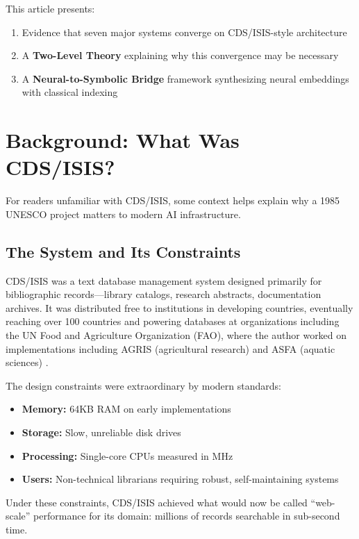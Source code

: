 \documentclass[manuscript,screen,nonacm]{acmart}
\begin{document}
This article presents:
\begin{enumerate}
    \item Evidence that seven major systems converge on CDS/ISIS-style architecture
    \item A \textbf{Two-Level Theory} explaining why this convergence may be necessary
    \item A \textbf{Neural-to-Symbolic Bridge} framework synthesizing neural embeddings with classical indexing
\end{enumerate}

\section{Background: What Was CDS/ISIS?}

For readers unfamiliar with CDS/ISIS, some context helps explain why a 1985 UNESCO project matters to modern AI infrastructure.

\subsection{The System and Its Constraints}

CDS/ISIS was a text database management system designed primarily for bibliographic records---library catalogs, research abstracts, documentation archives. It was distributed free to institutions in developing countries, eventually reaching over 100 countries and powering databases at organizations including the UN Food and Agriculture Organization (FAO), where the author worked on implementations including AGRIS (agricultural research) and ASFA (aquatic sciences) \cite{fao2005}.

The design constraints were extraordinary by modern standards:
\begin{itemize}
    \item \textbf{Memory:} 64KB RAM on early implementations
    \item \textbf{Storage:} Slow, unreliable disk drives
    \item \textbf{Processing:} Single-core CPUs measured in MHz
    \item \textbf{Users:} Non-technical librarians requiring robust, self-maintaining systems
\end{itemize}

Under these constraints, CDS/ISIS achieved what would now be called ``web-scale'' performance for its domain: millions of records searchable in sub-second time.
\end{document}
